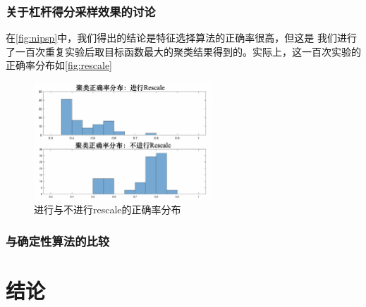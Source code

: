 \documentclass{ctexart}
\begin{document}
    \subsubsection{关于杠杆得分采样效果的讨论}
    \label{sec:lsdis}
    在\autoref{fig:nipsp}中，我们得出的结论是特征选择算法的正确率很高，但这是
    我们进行了一百次重复实验后取目标函数最大的聚类结果得到的。实际上，这一百次实验的正确率分布如\autoref{fig:rescale}

    \begin{figure}[H]
        \centering
        \includegraphics[width=0.6\textwidth]{result/nipscmp.png}
        \caption{进行与不进行rescale的正确率分布}
        \label{fig:rescale}
    \end{figure}




    \subsubsection{与确定性算法的比较}
    \label{sec:cmppca}

    \section{结论}

\nocite{*} %


\end{document}
